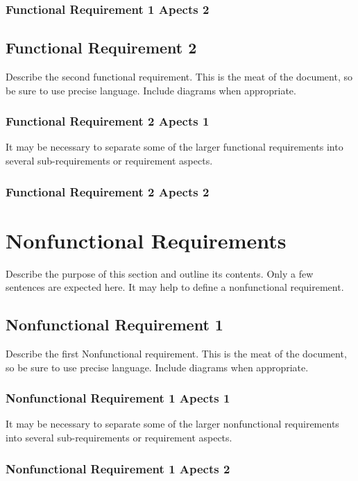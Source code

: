 \documentclass{article}
\begin{document}
\subsubsection{Functional Requirement 1 Apects 2}

\subsection{Functional Requirement 2}
Describe the second functional requirement. This is the meat of the document, so be sure to use precise language. Include diagrams when appropriate.

\subsubsection{Functional Requirement 2 Apects 1}
It may be necessary to separate some of the larger functional requirements into several sub-requirements or requirement aspects.

\subsubsection{Functional Requirement 2 Apects 2}

\section{Nonfunctional Requirements}
Describe the purpose of this section and outline its contents. Only a few sentences are expected here. It may help to define a nonfunctional requirement.

\subsection{Nonfunctional Requirement 1}
Describe the first Nonfunctional requirement. This is the meat of the document, so be sure to use precise language. Include diagrams when appropriate.

\subsubsection{Nonfunctional Requirement 1 Apects 1}
It may be necessary to separate some of the larger nonfunctional requirements into several sub-requirements or requirement aspects.

\subsubsection{Nonfunctional Requirement 1 Apects 2}
\end{document}
